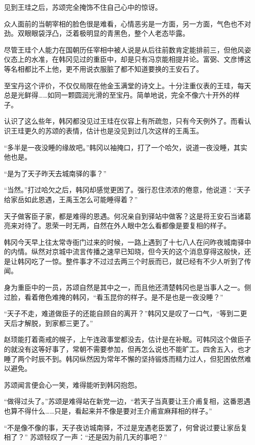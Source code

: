 见到王珪之后，苏颂完全掩饰不住自己心中的惊讶。

众人面前的当朝宰相的脸色很是难看，心情恶劣是一方面，另一方面，气色也不对劲。双眼眼袋浮凸，泛着极明显的青黑色，整个人老态毕露。

尽管王珪个人能力在国朝历任宰相中被人说是从后往前数肯定能排前三，但他风姿仪态上的水准，在韩冈见过的重臣中，却是只有冯京能相提并论。富弼、文彦博这等名相都比不上他，更不用说衣服脏了都不知道要换的王安石了。

至宝丹这个评价，不仅仅局限在他金玉满堂的诗文上。十分注重仪表的王珪，每天总是光鲜得……如同一颗圆润光滑的至宝丹。简单地说，完全不像六十开外的样子。

认识了这么些年，韩冈都没见过王珪在仪容上有所疏忽，只有今天例外了。而看认识王珪更久的苏颂的表情，估计也是没见到过几次这样的王禹玉。

“多半是一夜没睡的缘故吧。”韩冈以袖掩口，打了一个哈欠，说道一夜没睡，其实他也是。

“是为了天子昨天去城南驿的事？”

“当然。”打过哈欠之后，韩冈却感觉更困了。强行忍住浓浓的倦意，他说道：“天子给家岳如此恩遇，王禹玉怎么可能睡得着？”

天子做客臣子家，都是难得的恩遇。何况亲自到驿站中做客？这是将王安石当诸葛亮来对待了。恩荣一时无两，自然在外人眼中怎么看都像是要复相的样子。

韩冈今天早上往太常寺衙门过来的时候，一路上遇到了十七八人在问昨夜城南驿中的内情。纵然对京城中流言传播之速早已知晓，但今天的这个消息穿得这般快，还是让韩冈吃了一惊。整件事才不过过去两三个时辰而已，就已经有不少人听到了传闻。

身为重臣中的一员，苏颂自然是其中之一，而且他还清楚韩冈也是当事人之一。侧过脸，看着倦色难掩的韩冈，“看玉昆你的样子。是不是也是一夜没睡？”

“天子不走，难道做臣子的还能自顾自的离开？”韩冈又是叹了一口气，“等到二更天后才解脱，到家都三更了。”

赵顼能打着斋戒的幌子，上午连政事堂都没去，估计是在补眠。可韩冈这个做臣子的就没有这等好事了，常朝不需要参加，但再怎么说也不能旷工。四舍五入，也才睡了两个时辰不到。韩冈纵然因为常年不懈的坚持锻炼而精力过人，但犯困依然难以避免。

苏颂闻言便会心一笑，难得能听到韩冈抱怨。

“做得过头了。”苏颂是难得站在新党一边，“若天子当真要让王介甫复相，这番恩遇也算不得什么……只是，看起来并不像是要对王介甫宣麻拜相的样子。”

“不是像不像的事，天子夜访城南驿，不过是宠遇老臣罢了，何曾说过要让家岳复相了？”
苏颂轻叹了一声：“还是因为前几天的事吧？”


